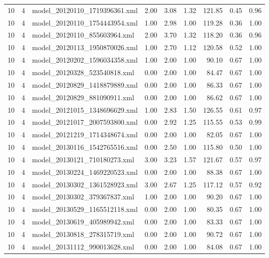\begin{table}[ht]
\begin{tabular}{rrlrrrrrr}
   10 &   4 & model\_20120110\_1719396361.xml & 2.00 & 3.08 & 1.32 & 121.85 & 0.45 & 0.96 \\ 
   10 &   4 & model\_20120110\_1754443954.xml & 1.00 & 2.98 & 1.00 & 119.28 & 0.36 & 1.00 \\ 
   10 &   4 & model\_20120110\_855603964.xml & 2.00 & 3.70 & 1.32 & 118.20 & 0.36 & 0.96 \\ 
   10 &   4 & model\_20120113\_1950870026.xml & 1.00 & 2.70 & 1.12 & 120.58 & 0.52 & 1.00 \\ 
   10 &   4 & model\_20120202\_1596034358.xml & 1.00 & 2.00 & 1.00 & 90.10 & 0.67 & 1.00 \\ 
   10 &   4 & model\_20120328\_523540818.xml & 0.00 & 2.00 & 1.00 & 84.47 & 0.67 & 1.00 \\ 
   10 &   4 & model\_20120829\_1418879889.xml & 0.00 & 2.00 & 1.00 & 86.33 & 0.67 & 1.00 \\ 
   10 &   4 & model\_20120829\_881090911.xml & 0.00 & 2.00 & 1.00 & 86.62 & 0.67 & 1.00 \\ 
   10 &   4 & model\_20121015\_1348696629.xml & 1.00 & 2.83 & 1.50 & 126.55 & 0.61 & 0.97 \\ 
   10 &   4 & model\_20121017\_2007593800.xml & 0.00 & 2.92 & 1.25 & 115.55 & 0.53 & 0.99 \\ 
   10 &   4 & model\_20121219\_1714348674.xml & 0.00 & 2.00 & 1.00 & 82.05 & 0.67 & 1.00 \\ 
   10 &   4 & model\_20130116\_1542765516.xml & 0.00 & 2.50 & 1.00 & 115.80 & 0.50 & 1.00 \\ 
   10 &   4 & model\_20130121\_710180273.xml & 3.00 & 3.23 & 1.57 & 121.67 & 0.57 & 0.97 \\ 
   10 &   4 & model\_20130224\_1469220523.xml & 0.00 & 2.00 & 1.00 & 88.38 & 0.67 & 1.00 \\ 
   10 &   4 & model\_20130302\_1361528923.xml & 3.00 & 2.67 & 1.25 & 117.12 & 0.57 & 0.92 \\ 
   10 &   4 & model\_20130302\_379367837.xml & 1.00 & 2.00 & 1.00 & 90.20 & 0.67 & 1.00 \\ 
   10 &   4 & model\_20130529\_1165512118.xml & 0.00 & 2.00 & 1.00 & 80.35 & 0.67 & 1.00 \\ 
   10 &   4 & model\_20130619\_405989942.xml & 0.00 & 2.00 & 1.00 & 83.33 & 0.67 & 1.00 \\ 
   10 &   4 & model\_20130818\_278315719.xml & 0.00 & 2.00 & 1.00 & 90.72 & 0.67 & 1.00 \\ 
   10 &   4 & model\_20131112\_990013628.xml & 0.00 & 2.00 & 1.00 & 84.08 & 0.67 & 1.00 \\ 

\end{tabular}
\end{table}
